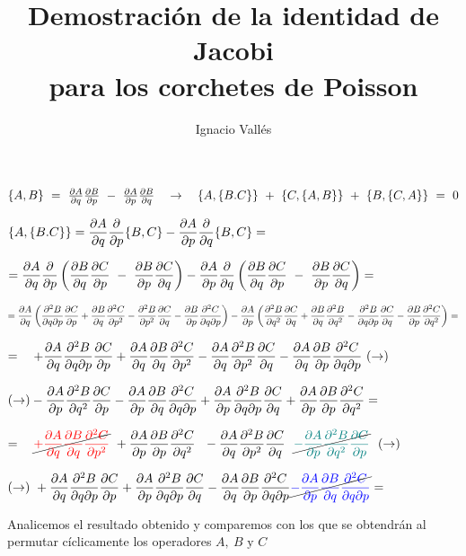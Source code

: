 \documentclass[a4paper,10pt]{article}
\title{Demostración de la identidad de Jacobi \\ para los corchetes de Poisson}
\author{Ignacio Vallés}
\begin{document}
\maketitle

$\{A,B\} \ = \  \pdv{A}{q} \pdv{B}{p} \ - \   \pdv{A}{p} \pdv{B}{q}
\quad \to \quad
\{A,\{B.C\}\} \ + \ \{C,\{A,B\}\} \ + \  \{B,\{C,A\}\} \ = \ 0$



\vspace{5mm}

$\displaystyle \{A,\{B.C\}\}=\pdv{A}{q} \pdv{p} \{B,C\} - \pdv{A}{p}\pdv{q} \{B,C\} = $

$\displaystyle =
\pdv{A}{q} \pdv{p} \left(\pdv{B}{q} \pdv{C}{p} \ - \   \pdv{B}{p} \pdv{C}{q} \right) - \pdv{A}{p}\pdv{q} \left(\pdv{B}{q} \pdv{C}{p} \ - \   \pdv{B}{p} \pdv{C}{q} \right)=$

\vspace{5mm} 

$=\displaystyle \pdv{A}{q}
\left( \pdv{B}{q}{p} \pdv{C}{p} + \pdv{B}{q} \pdv[2]{C}{p} -\pdv[2]{B}{p}\pdv{C}{q} - \pdv{B}{p} \pdv{C}{q}{p} \right)
-\pdv{A}{p}
\left( \pdv[2]{B}{q}\pdv{C}{q} + \pdv{B}{q}\pdv[2]{B}{q} - \pdv{B}{q}{p} \pdv{C}{q} - \pdv{B}{p}\pdv[2]{C}{q} \right) =$

\vspace{5mm} 
$=\displaystyle 
\ \ \ + \pdv{A}{q} \pdv{B}{q}{p} \pdv{C}{p} +\pdv{A}{q} \pdv{B}{q} \pdv[2]{C}{p} -\pdv{A}{q}\pdv[2]{B}{p}\pdv{C}{q} -\pdv{A}{q} \pdv{B}{p} \pdv{C}{q}{p} \ (\to) $

$\displaystyle (\to) -\pdv{A}{p} \pdv[2]{B}{q}\pdv{C}{p} -\pdv{A}{p} \pdv{B}{q}\pdv{C}{q}{p} +\pdv{A}{p} \pdv{B}{q}{p} \pdv{C}{q} +\pdv{A}{p}\pdv{B}{p}\pdv[2]{C}{q}  =$

\vspace{5mm} 

$\displaystyle =\ \ \  
\cancel{\textcolor{red}{+\pdv{A}{q} \pdv{B}{q} \pdv[2]{C}{p}} } \ +\pdv{A}{p}\pdv{B}{p}\pdv[2]{C}{q} \ \ -\pdv{A}{q}\pdv[2]{B}{p}\pdv{C}{q}  \ \ \cancel{\textcolor{teal}{ -\pdv{A}{p} \pdv[2]{B}{q}\pdv{C}{p} }}
\ \ (\to)
$

$\displaystyle (\to) \ 
+ \pdv{A}{q} \pdv{B}{q}{p} \pdv{C}{p} +\pdv{A}{p} \pdv{B}{q}{p} \pdv{C}{q}  -\pdv{A}{q} \pdv{B}{p} \pdv{C}{q}{p}  \cancel{\textcolor{blue}{-\pdv{A}{p} \pdv{B}{q}\pdv{C}{q}{p} } } =$

\vspace{5mm} 
Analicemos el resultado obtenido y comparemos con los que se obtendrán al permutar cíclicamente los operadores $A,\  B \text{ y } C$
\end{document}
